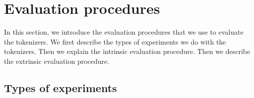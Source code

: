 






\section{Evaluation procedures}

In this section, we introduce the evaluation procedures that we use to evaluate the tokenizers. We first describe the types of experiments we do with the tokenizers. Then we explain the intrinsic evaluation procedure. Then we describe the extrinsic evaluation procedure.

\subsection{Types of experiments}

